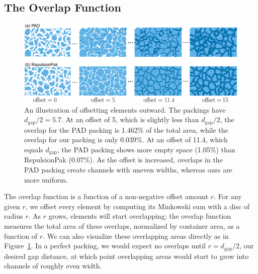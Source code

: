 \subsection{The Overlap Function}
\label{section_overlap_function}

\begin{figure}
\centering
\includegraphics[width=1.0\textwidth]{figures/metrics/overlap_metric.pdf}
\caption[An illustration of offsetting elements outward]
{\label{fig_overlap_function}
    An illustration of offsetting elements outward. The packings have $d_\mathrm{gap} / 2 = 5.7$.  
    At an offset of 5, which is slightly less than $d_\mathrm{gap} / 2$,
    the overlap for the PAD packing is 1.462\% of the total area, while the overlap for our packing is only 0.039\%.
    At an offset of 11.4, which equals $d_\mathrm{gap}$, the PAD packing shows more empty space (1.05\%) than RepulsionPak (0.07\%).
    As the offset is increased, overlaps in the PAD packing create channels
  with uneven widths, whereas ours are more uniform.
  }
\end{figure}

The overlap function is a function of a non-negative offset amount
$r$.  For any given $r$, we offset every element by computing its Minkowski
sum with a disc of radius $r$.  As $r$ grows, elements will start overlapping;
the overlap function measures the total area of these overlaps, normalized
by container area, as a function of $r$.  We can also visualize these 
overlapping areas directly as in Figure~\ref{fig_overlap_function}.  In a 
perfect packing, we would expect no overlaps until $r=d_\mathrm{gap}/2$,
our desired gap distance, at which point overlapping areas would start to
grow into channels of roughly even width.



